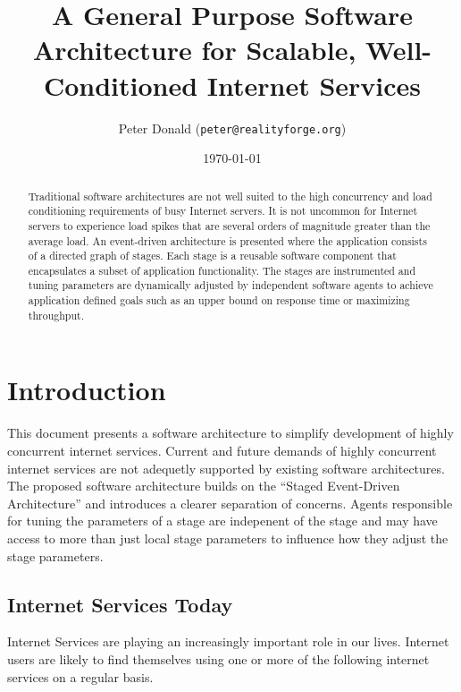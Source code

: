 \documentclass[a4paper]{article}
\begin{document}


\title{A General Purpose Software Architecture for Scalable, Well-Conditioned Internet Services}
\author{Peter Donald (\texttt{peter@realityforge.org})}
\date{\today}
\maketitle

\begin{abstract} 
Traditional software architectures are not well suited to the high concurrency and load conditioning requirements of busy Internet servers. It is not uncommon for Internet servers to experience load spikes that are several orders of magnitude greater than the average load. An event-driven architecture is presented where the application consists of a directed graph of stages. Each stage is a reusable software component that encapsulates a subset of application functionality. The stages are instrumented and tuning parameters are dynamically adjusted by independent software agents to achieve application defined goals such as an upper bound on response time or maximizing throughput. 
\end{abstract} 

\section{Introduction}

This document presents a software architecture to simplify development of highly concurrent internet services. Current and future demands of highly concurrent internet services are not adequetly supported by existing software architectures. The proposed software architecture builds on the ``Staged Event-Driven Architecture'' and introduces a clearer separation of concerns. Agents responsible for tuning the parameters of a stage are indepenent of the stage and may have access to more than just local stage parameters to influence how they adjust the stage parameters. 

\subsection{Internet Services Today}

Internet Services are playing an increasingly important role in our lives. Internet users are likely to find themselves using one or more of the following internet services on a regular basis. 
\end{document}
